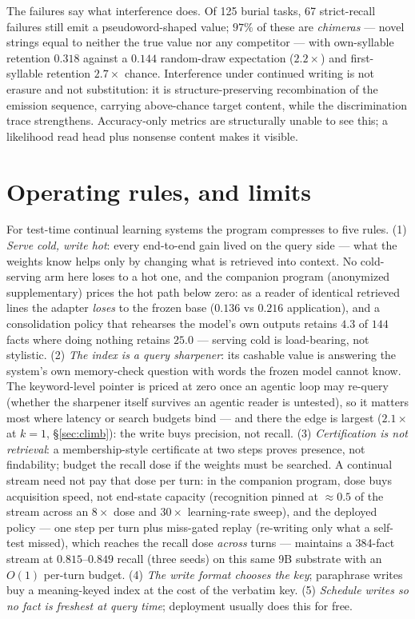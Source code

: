 \documentclass{article}
\begin{document}
The failures say what interference does. Of 125 burial tasks, 67 strict-recall failures
still emit a pseudoword-shaped value; $97\%$ of these are \emph{chimeras} --- novel strings
equal to neither the true value nor any competitor --- with own-syllable retention $0.318$
against a $0.144$ random-draw expectation ($2.2\times$) and first-syllable retention
$2.7\times$ chance. Interference under continued writing is not erasure and not
substitution: it is structure-preserving recombination of the emission sequence, carrying
above-chance target content, while the discrimination trace strengthens. Accuracy-only
metrics are structurally unable to see this; a likelihood read head plus nonsense content
makes it visible.

\section{Operating rules, and limits}\label{sec:rules}

For test-time continual learning systems the program compresses to five rules. (1)
\emph{Serve cold, write hot}: every end-to-end gain lived on the query side --- what the
weights know helps only by changing what is retrieved into context. No cold-serving arm
here loses to a hot one, and the companion program (anonymized supplementary) prices the
hot path below zero: as a reader of identical retrieved lines the adapter \emph{loses} to
the frozen base ($0.136$ vs $0.216$ application), and a consolidation policy that
rehearses the model's own outputs retains $4.3$ of $144$ facts where doing nothing
retains $25.0$ --- serving cold is load-bearing, not stylistic.
(2) \emph{The index is a query sharpener}: its cashable value is answering the system's own
memory-check question with words the frozen model cannot know. The keyword-level pointer
is priced at zero once an agentic loop may re-query (whether the sharpener itself survives
an agentic reader is untested), so it matters most where latency or search budgets bind ---
and there the edge is largest ($2.1\times$ at $k{=}1$, \S\ref{sec:climb}): the write
buys precision, not recall. (3) \emph{Certification is not retrieval}: a membership-style
certificate at two steps proves presence, not findability; budget the recall dose if the
weights must be searched. A continual stream need not pay that dose per turn: in the
companion program, dose buys acquisition speed, not end-state capacity (recognition
pinned at ${\approx}0.5$ of the stream across an $8\times$ dose and $30\times$
learning-rate sweep), and the deployed policy --- one step per turn plus miss-gated
replay (re-writing only what a self-test missed), which reaches the recall dose
\emph{across} turns --- maintains a 384-fact stream
at $0.815$--$0.849$ recall (three seeds) on this same 9B substrate with an $O(1)$
per-turn budget. (4) \emph{The write format chooses the key}; paraphrase writes
buy a meaning-keyed index at the cost of the verbatim key. (5) \emph{Schedule writes so no
fact is freshest at query time}; deployment usually does this for free.
\end{document}
